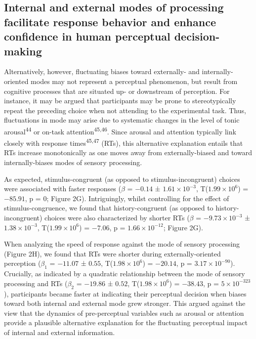 \documentclass[
]{article}
\begin{document}
\hypertarget{internal-and-external-modes-of-processing-facilitate-response-behavior-and-enhance-confidence-in-human-perceptual-decision-making}{%
\subsection{Internal and external modes of processing facilitate
response behavior and enhance confidence in human perceptual
decision-making}\label{internal-and-external-modes-of-processing-facilitate-response-behavior-and-enhance-confidence-in-human-perceptual-decision-making}}

Alternatively, however, fluctuating biases toward externally- and
internally-oriented modes may not represent a perceptual phenomenon, but
result from cognitive processes that are situated up- or downstream of
perception. For instance, it may be argued that participants may be
prone to stereotypically repeat the preceding choice when not attending
to the experimental task. Thus, fluctuations in mode may arise due to
systematic changes in the level of tonic arousal\textsuperscript{44} or
on-task attention\textsuperscript{45,46}. Since arousal and attention
typically link closely with response times\textsuperscript{45,47} (RTs),
this alternative explanation entails that RTs increase monotonically as
one moves away from externally-biased and toward internally-biases modes
of sensory processing.

As expected, stimulus-congruent (as opposed to stimulus-incongruent)
choices were associated with faster responses (\(\beta\) = \(-0.14\) ±
\(\ensuremath{1.61\times 10^{-3}}\),
T(\(\ensuremath{1.99\times 10^{6}}\)) = \(-85.91\), p = \(0\); Figure
2G). Intriguingly, whilst controlling for the effect of
stimulus-congruence, we found that history-congruent (as opposed to
history-incongruent) choices were also characterized by shorter RTs
(\(\beta\) = \(\ensuremath{-9.73\times 10^{-3}}\) ±
\(\ensuremath{1.38\times 10^{-3}}\),
T(\(\ensuremath{1.99\times 10^{6}}\)) = \(-7.06\), p =
\(\ensuremath{1.66\times 10^{-12}}\); Figure 2G).

When analyzing the speed of response against the mode of sensory
processing (Figure 2H), we found that RTs were shorter during
externally-oriented perception (\(\beta_1\) = \(-11.07\) ± \(0.55\),
T(\(\ensuremath{1.98\times 10^{6}}\)) = \(-20.14\), p =
\(\ensuremath{3.17\times 10^{-90}}\)). Crucially, as indicated by a
quadratic relationship between the mode of sensory processing and RTs
(\(\beta_2\) = \(-19.86\) ± \(0.52\),
T(\(\ensuremath{1.98\times 10^{6}}\)) = \(-38.43\), p =
\(\ensuremath{5\times 10^{-323}}\)), participants became faster at
indicating their perceptual decision when biases toward both internal
and external mode grew stronger. This argued against the view that the
dynamics of pre-perceptual variables such as arousal or attention
provide a plausible alternative explanation for the fluctuating
perceptual impact of internal and external information.
\end{document}
